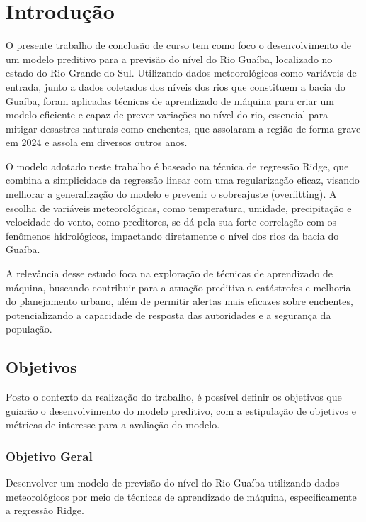 \chapter{Introdução}
O presente trabalho de conclusão de curso tem como foco o desenvolvimento de um modelo preditivo para a previsão do nível do Rio Guaíba, localizado no estado do Rio Grande do Sul. Utilizando dados meteorológicos como variáveis de entrada, junto a dados coletados dos níveis dos rios que constituem a bacia do Guaíba, foram aplicadas técnicas de aprendizado de máquina para criar um modelo eficiente e capaz de prever variações no nível do rio, essencial para mitigar desastres naturais como enchentes, que assolaram a região de forma grave em 2024 e assola em diversos outros anos.

O modelo adotado neste trabalho é baseado na técnica de regressão Ridge, que combina a simplicidade da regressão linear com uma regularização eficaz, visando melhorar a generalização do modelo e prevenir o sobreajuste (overfitting). A escolha de variáveis meteorológicas, como temperatura, umidade, precipitação e velocidade do vento, como preditores, se dá pela sua forte correlação com os fenômenos hidrológicos, impactando diretamente o nível dos rios da bacia do Guaíba.

A relevância desse estudo foca na exploração de técnicas de aprendizado de máquina, buscando contribuir para a atuação preditiva a catástrofes e melhoria do planejamento urbano, além de permitir alertas mais eficazes sobre enchentes, potencializando a capacidade de resposta das autoridades e a segurança da população.

\section{Objetivos}

Posto o contexto da realização do trabalho, é possível definir os objetivos que guiarão o desenvolvimento do modelo preditivo, com a estipulação de objetivos e métricas de interesse para a avaliação do modelo.

\subsection{Objetivo Geral}

Desenvolver um modelo de previsão do nível do Rio Guaíba utilizando dados meteorológicos por meio de técnicas de aprendizado de máquina, especificamente a regressão Ridge.

